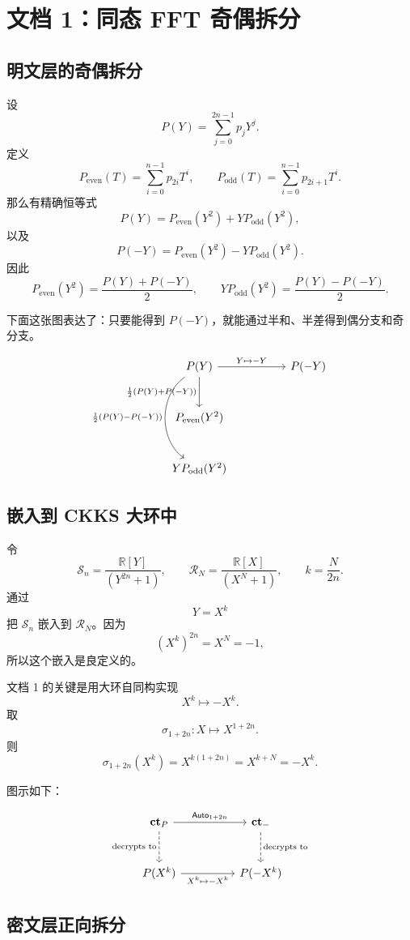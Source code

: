 \documentclass[11pt]{article}
\newcommand{\RR}{\mathbb R}
\newcommand{\Rbig}{\mathcal R_N}
\newcommand{\Sn}{\mathcal S_n}
\newcommand{\Pe}{P_{\mathrm{even}}}
\newcommand{\Po}{P_{\mathrm{odd}}}
\newcommand{\ct}{\mathbf{ct}}
\newcommand{\ctP}{\mathbf{ct}_P}
\newcommand{\Auto}{\mathsf{Auto}}
\begin{document}
\newpage

\section{文档 1：同态 FFT 奇偶拆分}

\subsection{明文层的奇偶拆分}

设
\[
P(Y)=\sum_{j=0}^{2n-1}p_jY^j.
\]
定义
\[
\Pe(T)=\sum_{i=0}^{n-1}p_{2i}T^i,
\qquad
\Po(T)=\sum_{i=0}^{n-1}p_{2i+1}T^i.
\]
那么有精确恒等式
\[
P(Y)=\Pe(Y^2)+Y\Po(Y^2),
\]
以及
\[
P(-Y)=\Pe(Y^2)-Y\Po(Y^2).
\]
因此
\[
\Pe(Y^2)=\frac{P(Y)+P(-Y)}{2},
\qquad
Y\Po(Y^2)=\frac{P(Y)-P(-Y)}{2}.
\]

下面这张图表达了：只要能得到 $P(-Y)$，就能通过半和、半差得到偶分支和奇分支。

\[
\begin{tikzcd}[column sep=huge,row sep=large]
P(Y)
  \arrow[r,"Y\mapsto -Y"]
  \arrow[d,"\frac{1}{2}(P(Y)+P(-Y))"']
  \arrow[dd,"\frac{1}{2}(P(Y)-P(-Y))"', bend right=55]
&
P(-Y)
\\
\Pe(Y^2)
\\
Y\Po(Y^2)
\end{tikzcd}
\]

\subsection{嵌入到 CKKS 大环中}

令
\[
\Sn=\frac{\RR[Y]}{(Y^{2n}+1)},
\qquad
\Rbig=\frac{\RR[X]}{(X^N+1)},
\qquad
k=\frac{N}{2n}.
\]
通过
\[
Y=X^k
\]
把 $\Sn$ 嵌入到 $\Rbig$。因为
\[
(X^k)^{2n}=X^N=-1,
\]
所以这个嵌入是良定义的。

文档 1 的关键是用大环自同构实现
\[
X^k\mapsto -X^k.
\]
取
\[
\sigma_{1+2n}:X\mapsto X^{1+2n}.
\]
则
\[
\sigma_{1+2n}(X^k)=X^{k(1+2n)}=X^{k+N}=-X^k.
\]

图示如下：

\[
\begin{tikzcd}[column sep=huge,row sep=large]
\ctP
  \arrow[r,"\Auto_{1+2n}"]
  \arrow[d,dashed,"\text{decrypts to}"']
&
\ct_{-}
  \arrow[d,dashed,"\text{decrypts to}"]
\\
P(X^k)
  \arrow[r,"X^k\mapsto -X^k"']
&
P(-X^k)
\end{tikzcd}
\]

\subsection{密文层正向拆分}
\end{document}
